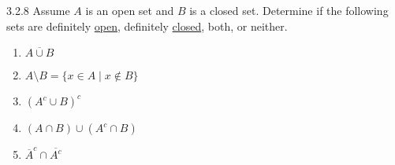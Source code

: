 \begin{exercise}
    {3.2.8} Assume \(A\) is an open set and \(B\) is a closed set. Determine if the following sets are definitely \hyperref[def:3.2.2]{open}, definitely \hyperref[def:3.2.5]{closed}, both, or neither.
    \begin{enumerate}
        \item \(\overline{A \cup B}\)
        \item \(A \setminus B = \{x \in A \mid x \notin B\}\)
        \item \((A^c \cup B)^c\)
        \item \((A \cap B) \cup (A^c \cap B)\)
        \item \(\overline{A}^c \cap \overline{A^c}\)
    \end{enumerate}
\end{exercise}

